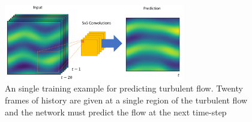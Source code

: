 \documentclass[10pt,letterpaper]{report}
\author{Brandon Houghton}
\begin{document}
	
\begin{figure}
	\begin{center}
		\includegraphics[width=0.7\textwidth]{images/setup.PNG}
		\caption{\small An single training example for predicting turbulent flow. Twenty frames of history are given at a single region of the turbulent flow and the network must predict the flow at the next time-step }
		\label{setup}
	\end{center}	
\end{figure}
\end{document}
